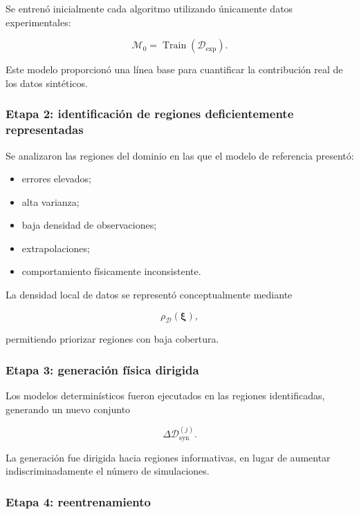 Se entrenó inicialmente cada algoritmo utilizando únicamente datos experimentales:

\begin{equation}
\mathcal{M}_{0}
=
\operatorname{Train}
\left(
\mathcal{D}_{\mathrm{exp}}
\right).
\end{equation}

Este modelo proporcionó una línea base para cuantificar la contribución real de los datos sintéticos.

\subsubsection*{Etapa 2: identificación de regiones deficientemente representadas}

Se analizaron las regiones del dominio en las que el modelo de referencia presentó:

\begin{itemize}
    \item errores elevados;
    \item alta varianza;
    \item baja densidad de observaciones;
    \item extrapolaciones;
    \item comportamiento físicamente inconsistente.
\end{itemize}

La densidad local de datos se representó conceptualmente mediante

\begin{equation}
\rho_{\mathcal{D}}
\left(
\boldsymbol{\xi}
\right),
\end{equation}

permitiendo priorizar regiones con baja cobertura.

\subsubsection*{Etapa 3: generación física dirigida}

Los modelos determinísticos fueron ejecutados en las regiones identificadas, generando un nuevo conjunto

\begin{equation}
\Delta\mathcal{D}_{\mathrm{syn}}^{(j)}.
\end{equation}

La generación fue dirigida hacia regiones informativas, en lugar de aumentar indiscriminadamente el número de simulaciones.

\subsubsection*{Etapa 4: reentrenamiento}

